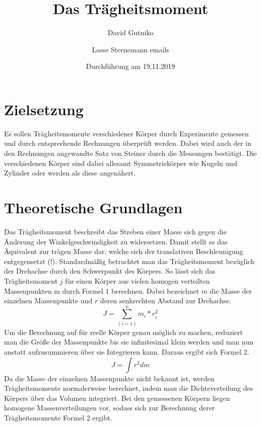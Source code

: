 \documentclass[titlepage = firstcover]{scrartcl}
\title{Das Trägheitsmoment}
\author{David Gutniko \and Lasse Sternemann emails}
\date{Durchführung am 19.11.2019}
\begin{document}
    \maketitle

    \section{Zielsetzung}
    Es sollen Trägheitsmomente verschiedener Körper durch Experimente gemessen und durch entsprechende Rechnungen überprüft werden. 
    Dabei wird auch der in den Rechnungen angewandte Satz von Steiner durch die Messungen bestätigt. Die verschiedenen Körper sind dabei 
    allesamt Symmetriekörper wie Kugeln und Zylinder oder werden als diese angenähert.

    \section{Theoretische Grundlagen}
    Das Trägheitsmoment beschreibt das Streben einer Masse sich gegen die Änderung der Winkelgeschwindigkeit zu widersetzen. Damit stellt es 
    das Äquivalent zur trägen Masse dar, welche sich der translativen Beschleunigung entgegensetzt (!).
    Standardmäßig betrachtet man das Trägheitsmoment bezüglich der Drehachse durch den Schwerpunkt des Körpers. So lässt sich das Trägheitsmoment 
    $j$ für einen Körper aus vielen homogen verteilten Massenpunkten m durch Formel 1 berechnen. Dabei bezeichnet $m$ die Masse der einzelnen 
    Massenpunkte und $r$ deren senkrechten Abstand zur Drehachse.
    \begin{equation}
      J = \sum_(i=1)^n m_i * r_i^2
    \end{equation}
    Um die Berechnung auf für reelle Körper genau möglich zu machen, reduziert man die Größe der Massenpunkte bis sie infinitesimal klein werden und man 
    nun anstatt aufzusummieren über sie Integrieren kann. Daraus ergibt sich Formel 2.
    \begin{equation}
      J = \int r^2 dm
    \end{equation}
    Da die Masse der einzelnen Massenpunkte nicht bekannt ist, werden Trägheitsmomente normalerweise berechnet, indem man die Dichteverteilung des Körpers 
    über das Volumen integriert. Bei den gemessenen Körpern liegen homogene Massenverteilungen vor, sodass sich zur Berechnung derer Trägheitsmomente 
    Formel 2 ergibt.  
\end{document}
